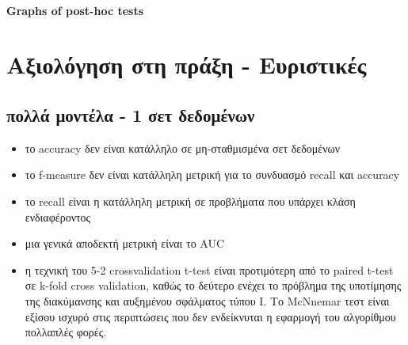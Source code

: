 \documentclass[]{article}
\numberwithin{equation}{section}		%
\numberwithin{figure}{section}			%
\numberwithin{table}{section}				%
\begin{document}
    \paragraph{Graphs of post-hoc tests}
    \section{Αξιολόγηση στη πράξη - Ευριστικές}
    \citep{Demsar:2006:SCC:1248547.1248548}
    \subsection{πολλά μοντέλα - 1 σετ δεδομένων}
    \begin{itemize}
    	\item το accuracy δεν είναι κατάλληλο σε μη-σταθμισμένα σετ δεδομένων
    	\item το f-measure δεν είναι κατάλληλη μετρική για το συνδυασμό recall και accuracy
    	\item το recall είναι η κατάλληλη μετρική σε προβλήματα που υπάρχει κλάση ενδιαφέροντος
    	\item μια γενικά αποδεκτή μετρική είναι το AUC
    	\item η τεχνική του 5-2 crossvalidation t-test είναι προτιμότερη από το paired t-test σε k-fold cross validation, καθώς το δεύτερο ενέχει το πρόβλημα της υποτίμησης της διακύμανσης και αυξημένου σφάλματος τύπου Ι. Το ΜcNnemar τεστ είναι εξίσου ισχυρό στις περιπτώσεις που δεν ενδείκνυται η εφαρμογή του αλγορίθμου πολλαπλές φορές.
    \end{itemize}
\end{document}
